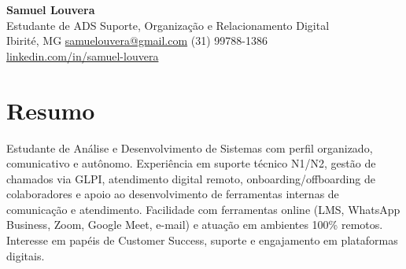 \documentclass[11pt,a4paper]{article}
\begin{document}
{\LARGE\bfseries\color{accent} Samuel Louvera}\\[3pt]
{\large Estudante de ADS \textbar{} Suporte, Organização e Relacionamento Digital}\\[5pt]
Ibirité, MG \quad\textbullet\quad
\href{mailto:samuelouvera@gmail.com}{samuelouvera@gmail.com} \quad\textbullet\quad
(31) 99788-1386\\
\href{https://linkedin.com/in/samuel-louvera}{linkedin.com/in/samuel-louvera}

\section{Resumo}
Estudante de Análise e Desenvolvimento de Sistemas com perfil organizado, comunicativo e autônomo.
Experiência em suporte técnico N1/N2, gestão de chamados via GLPI, atendimento digital remoto,
onboarding/offboarding de colaboradores e apoio ao desenvolvimento de ferramentas internas de
comunicação e atendimento. Facilidade com ferramentas online (LMS, WhatsApp Business, Zoom, Google
Meet, e-mail) e atuação em ambientes 100\% remotos. Interesse em papéis de Customer Success, suporte
e engajamento em plataformas digitais.

\end{document}
